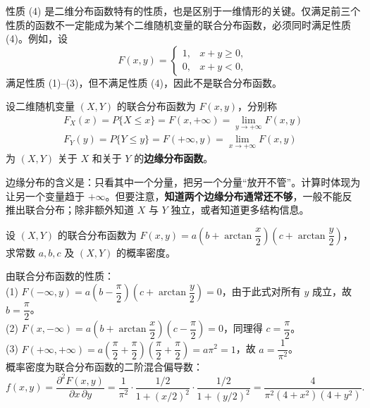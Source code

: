 ﻿\documentclass[lang=cn,11pt]{elegantbook}
\begin{document}
\begin{remark}
性质 (4) 是二维分布函数特有的性质，也是区别于一维情形的关键。仅满足前三个性质的函数不一定能成为某个二维随机变量的联合分布函数，必须同时满足性质 (4)。例如，设
\[
F(x,y) = \begin{cases} 1, & x+y \geqslant 0, \\ 0, & x+y < 0, \end{cases}
\]
满足性质 (1)--(3)，但不满足性质 (4)，因此不是联合分布函数。
\end{remark}

\begin{definition}[边缘分布函数] \label{def:marginal-df}
设二维随机变量 $(X,Y)$ 的联合分布函数为 $F(x,y)$，分别称
\begin{align*}
F_X(x) = P\{X \leqslant x\} = F(x, +\infty) = \lim_{y \to +\infty} F(x,y)\\
 F_Y(y) = P\{Y \leqslant y\} = F(+\infty, y) = \lim_{x \to +\infty} F(x,y)
\end{align*}
为 $(X,Y)$ 关于 $X$ 和关于 $Y$ 的\textbf{边缘分布函数}。
\end{definition}

\begin{note}
边缘分布的含义是：只看其中一个分量，把另一个分量“放开不管”。计算时体现为让另一个变量趋于 $+\infty$。但要注意，\textbf{知道两个边缘分布通常还不够}，一般不能反推出联合分布；除非额外知道 $X$ 与 $Y$ 独立，或者知道更多结构信息。
\end{note}


\begin{exercise}\label{exer:3-1}
设 $(X,Y)$ 的联合分布函数为 $F(x,y) = a\left(b + \arctan\dfrac{x}{2}\right)\left(c + \arctan\dfrac{y}{2}\right)$，求常数 $a, b, c$ 及 $(X,Y)$ 的概率密度。
\end{exercise}
\begin{solution}
由联合分布函数的性质：\\
(1) $F(-\infty, y) = a\left(b - \dfrac{\pi}{2}\right)\left(c + \arctan\dfrac{y}{2}\right) = 0$，由于此式对所有 $y$ 成立，故 $b = \dfrac{\pi}{2}$。\\
(2) $F(x, -\infty) = a\left(b + \arctan\dfrac{x}{2}\right)\left(c - \dfrac{\pi}{2}\right) = 0$，同理得 $c = \dfrac{\pi}{2}$。\\
(3) $F(+\infty, +\infty) = a\left(\dfrac{\pi}{2} + \dfrac{\pi}{2}\right)\left(\dfrac{\pi}{2} + \dfrac{\pi}{2}\right) = a\pi^2 = 1$，故 $a = \dfrac{1}{\pi^2}$。\\
概率密度为联合分布函数的二阶混合偏导数：
\[
f(x,y) = \frac{\partial^2 F(x,y)}{\partial x\,\partial y} = \frac{1}{\pi^2} \cdot \frac{1/2}{1 + (x/2)^2} \cdot \frac{1/2}{1 + (y/2)^2} = \frac{4}{\pi^2(4+x^2)(4+y^2)}.
\]
\end{solution}
\end{document}
